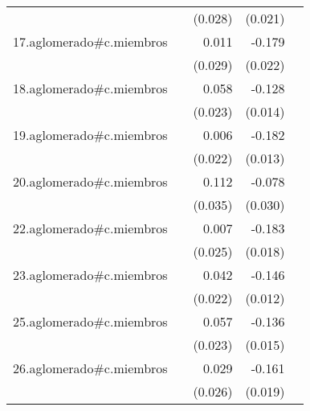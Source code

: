 {\begin{longtable}{l*{4}{D{.}{.}{-1}}}
            &                     &     (0.028)         &     (0.021)         &                     \\
\addlinespace
17.aglomerado#c.miembros&                     &       0.011         &      -0.179\sym{***}&                     \\
            &                     &     (0.029)         &     (0.022)         &                     \\
\addlinespace
18.aglomerado#c.miembros&                     &       0.058\sym{*}  &      -0.128\sym{***}&                     \\
            &                     &     (0.023)         &     (0.014)         &                     \\
\addlinespace
19.aglomerado#c.miembros&                     &       0.006         &      -0.182\sym{***}&                     \\
            &                     &     (0.022)         &     (0.013)         &                     \\
\addlinespace
20.aglomerado#c.miembros&                     &       0.112\sym{**} &      -0.078\sym{*}  &                     \\
            &                     &     (0.035)         &     (0.030)         &                     \\
\addlinespace
22.aglomerado#c.miembros&                     &       0.007         &      -0.183\sym{***}&                     \\
            &                     &     (0.025)         &     (0.018)         &                     \\
\addlinespace
23.aglomerado#c.miembros&                     &       0.042         &      -0.146\sym{***}&                     \\
            &                     &     (0.022)         &     (0.012)         &                     \\
\addlinespace
25.aglomerado#c.miembros&                     &       0.057\sym{*}  &      -0.136\sym{***}&                     \\
            &                     &     (0.023)         &     (0.015)         &                     \\
\addlinespace
26.aglomerado#c.miembros&                     &       0.029         &      -0.161\sym{***}&                     \\
            &                     &     (0.026)         &     (0.019)         &                     \\

\end{longtable}}
